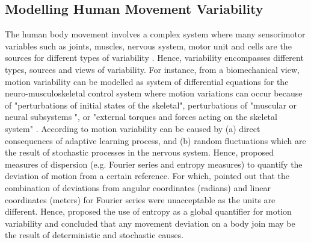 \subsection{Modelling Human Movement Variability}
The human body movement involves a complex system where many sensorimotor 
variables such as joints, muscles, nervous system, motor unit and cells 
are the sources for different types of variability \citep{newell1993}.
Hence, variability encompasses different types, sources and views of 
variability.
For instance, from a biomechanical view, motion variability can be modelled
as system of differential equations for the neuro-musculoskeletal 
control system where motion variations can occur because of 
"perturbations of initial states of the skeletal",
perturbations of "muscular or neural subsystems ",
or "external torques and forces acting on the skeletal system" 
\citep[p. 13]{hatze1986}.
According to \cite{hatze1986} motion variability can be caused by 
(a) direct consequences of adaptive learning process, and 
(b) random fluctuations which are the result of stochastic processes 
in the nervous system. Hence, \cite{hatze1986} proposed measures of 
dispersion (e.g. Fourier series and entropy measures) to quantify the 
deviation of motion from a certain reference. For which, 
\cite{hatze1986} pointed out that the combination of deviations from 
angular coordinates (radians) and linear coordinates (meters)
for Fourier series were unacceptable as the units are different.
Hence, \cite{hatze1986} proposed the use of entropy as a global quantifier 
for motion variability and concluded that any movement deviation on a 
body join may be the result of deterministic and stochastic causes.





